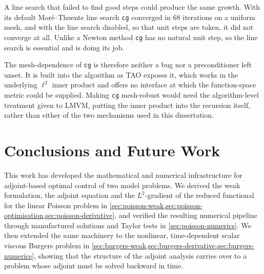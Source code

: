 \documentclass[a4paper,11pt]{article}
\theoremstyle{spacedplain} \newtheorem{theorem}[counter]{Theorem} \newtheorem{lemma}[counter]{Lemma} \newtheorem{prop}[counter]{Proposition} \newtheorem{cor}[counter]{Corollary}
\theoremstyle{spaceddefinition} \newtheorem{defn}[counter]{Definition} \newtheorem{example}[counter]{Example} \newtheorem{remark}[counter]{Remark}
\begin{document}
A line search that failed to find good steps could produce the same growth. With its default Mor\'e--Thuente line search \texttt{cg} converged in $68$ iterations on a uniform mesh, and with the line search disabled, so that unit steps are taken, it did not converge at all. Unlike a Newton method \texttt{cg} has no natural unit step, so the line search is essential and is doing its job.

The mesh-dependence of \texttt{cg} is therefore neither a bug nor a preconditioner left unset. It is built into the algorithm as TAO exposes it, which works in the underlying $\ell^{2}$ inner product and offers no interface at which the function-space metric could be supplied. Making \texttt{cg} mesh-robust would need the algorithm-level treatment given to LMVM, putting the inner product into the recursion itself, rather than either of the two mechanisms used in this dissertation.

\section{Conclusions and Future Work}
\label{sec:conclusions}

This work has developed the mathematical and numerical infrastructure for adjoint-based optimal control of two model problems. We derived the weak formulation, the adjoint equation and the $L^2$-gradient of the reduced functional for the linear Poisson problem in \cref{sec:poisson-weak,sec:poisson-optimisation,sec:poisson-derivative}, and verified the resulting numerical pipeline through manufactured solutions and Taylor tests in \cref{sec:poisson-numerics}. We then extended the same machinery to the nonlinear, time-dependent scalar viscous Burgers problem in \cref{sec:burgers-weak,sec:burgers-derivative,sec:burgers-numerics}, showing that the structure of the adjoint analysis carries over to a problem whose adjoint must be solved backward in time.
\end{document}
